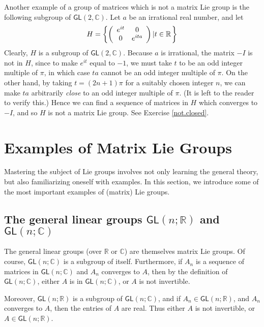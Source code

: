 \documentclass{amsbook}
\theoremstyle{plain}
\numberwithin{equation}{chapter}
\numberwithin{theorem}{chapter}
\begin{document}
Another example of a group of matrices which is not a matrix Lie group is the
following subgroup of $\mathsf{GL}(2,\mathbb{C})$. Let $a$ be an irrational
real number, and let
\[
H=\left\{  \left(
\begin{array}
[c]{cc}%
e^{it} & 0\\
0 & e^{ita}%
\end{array}
\right)  \left|  t\in\mathbb{R}\right.  \right\}
\]
Clearly, $H$ is a subgroup of $\mathsf{GL}(2,\mathbb{C})$. Because $a$ is
irrational, the matrix $-I$ is not in $H$, since to make $e^{it}$ equal to
$-1$, we must take $t$ to be an odd integer multiple of $\pi$, in which case
$ta$ cannot be an odd integer multiple of $\pi$. On the other hand, by taking
$t=(2n+1)\pi$ for a suitably chosen integer $n$, we can make $ta$ arbitrarily
\textit{close }to an odd integer multiple of $\pi$. (It is left to the reader
to verify this.) Hence we can find a sequence of matrices in $H $ which
converges to $-I$, and so $H$ is not a matrix Lie group. See Exercise
\ref{not.closed}.

\section{Examples of Matrix Lie Groups}

Mastering the subject of Lie groups involves not only learning the general
theory, but also familiarizing oneself with examples. In this section, we
introduce some of the most important examples of (matrix) Lie groups.

\subsection{The general linear groups $\mathsf{GL}(n;\mathbb{R})$ and
$\mathsf{GL}(n;\mathbb{C})$}

The general linear groups (over $\mathbb{R}$ or $\mathbb{C}$) are themselves
matrix Lie groups. Of course, $\mathsf{GL}(n;\mathbb{C})$ is a subgroup of
itself. Furthermore, if $A_{n}$ is a sequence of matrices in $\mathsf{GL}%
(n;\mathbb{C})$ and $A_{n}$ converges to $A$, then by the definition of
$\mathsf{GL}(n;\mathbb{C})$, either $A$ is in $\mathsf{GL}(n;\mathbb{C})$, or
$A$ is not invertible.

Moreover, $\mathsf{GL}(n;\mathbb{R})$ is a subgroup of $\mathsf{GL}%
(n;\mathbb{C})$, and if $A_{n}\in\mathsf{GL}(n;\mathbb{R})$, and $A_{n}$
converges to $A$, then the entries of $A$ are real. Thus either $A$ is not
invertible, or $A\in\mathsf{GL}(n;\mathbb{R})$.
\end{document}
